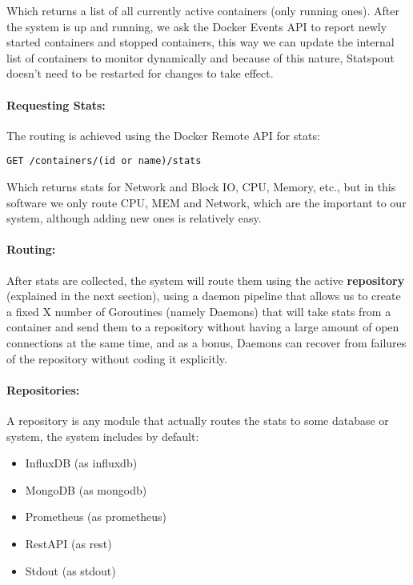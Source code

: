 Which returns a list of all currently active containers (only running ones). After the system is up and running, we ask the Docker Events API to report newly started containers and stopped containers, this way we can update the internal list of containers to monitor dynamically and because of this nature, Statspout doesn't need to be restarted for changes to take effect.

\paragraph{Requesting Stats:} The routing is achieved using the Docker Remote API for stats:

\begin{lstlisting}
GET /containers/(id or name)/stats
\end{lstlisting}

Which returns stats for Network and Block IO, CPU, Memory, etc., but in this software we only route CPU, MEM and Network, which are the important to our system, although adding new ones is relatively easy.

\paragraph{Routing:} After stats are collected, the system will route them using the active \textbf{repository} (explained in the next section), using a daemon pipeline that allows us to create a fixed X number of Goroutines (namely Daemons) that will take stats from a container and send them to a repository without having a large amount of open connections at the same time, and as a bonus, Daemons can recover from failures of the repository without coding it explicitly.

\paragraph{Repositories:} A repository is any module that actually routes the stats to some database or system, the system includes by default:

\begin{itemize}
    \item InfluxDB (as influxdb)
    \item MongoDB (as mongodb)
    \item Prometheus (as prometheus)
    \item RestAPI (as rest)
    \item Stdout (as stdout)
\end{itemize}


